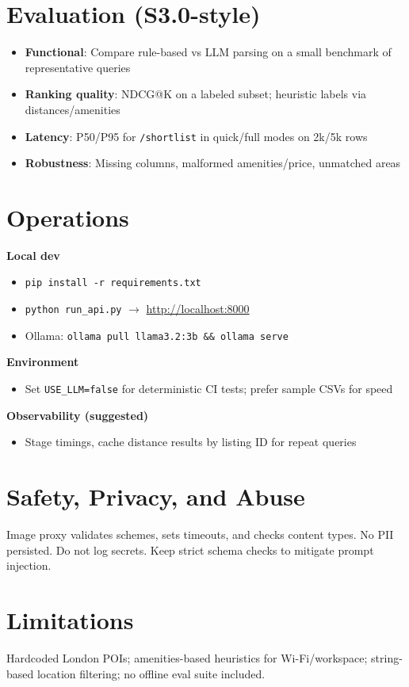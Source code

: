\documentclass[11pt]{article}
\begin{document}
\section{Evaluation (S3.0-style)}
\begin{itemize}
  \item \textbf{Functional}: Compare rule-based vs LLM parsing on a small benchmark of representative queries
  \item \textbf{Ranking quality}: NDCG@K on a labeled subset; heuristic labels via distances/amenities
  \item \textbf{Latency}: P50/P95 for \texttt{/shortlist} in quick/full modes on 2k/5k rows
  \item \textbf{Robustness}: Missing columns, malformed amenities/price, unmatched areas
\end{itemize}

\section{Operations}
\textbf{Local dev}
\begin{itemize}
  \item \texttt{pip install -r requirements.txt}
  \item \texttt{python run\_api.py} $\rightarrow$ \url{http://localhost:8000}
  \item Ollama: \texttt{ollama pull llama3.2:3b \&\& ollama serve}
\end{itemize}
\textbf{Environment}
\begin{itemize}
  \item Set \texttt{USE\_LLM=false} for deterministic CI tests; prefer sample CSVs for speed
\end{itemize}
\textbf{Observability (suggested)}
\begin{itemize}
  \item Stage timings, cache distance results by listing ID for repeat queries
\end{itemize}

\section{Safety, Privacy, and Abuse}
Image proxy validates schemes, sets timeouts, and checks content types. No PII persisted. Do not log secrets. Keep strict schema checks to mitigate prompt injection.

\section{Limitations}
Hardcoded London POIs; amenities-based heuristics for Wi-Fi/workspace; string-based location filtering; no offline eval suite included.
\end{document}
